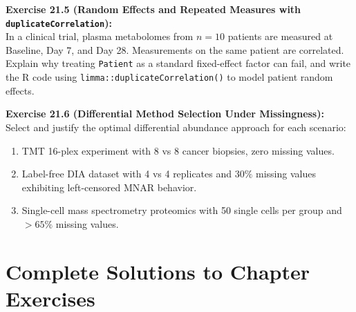 \documentclass[11pt,twoside,openright]{book}
\begin{document}
\vspace{0.5em}
\noindent
\textbf{Exercise 21.5 (Random Effects and Repeated Measures with \texttt{duplicateCorrelation}):}\\
In a clinical trial, plasma metabolomes from $n = 10$ patients are measured at Baseline, Day 7, and Day 28. Measurements on the same patient are correlated. Explain why treating \texttt{Patient} as a standard fixed-effect factor can fail, and write the R code using \texttt{limma::duplicateCorrelation()} to model patient random effects.

\vspace{0.5em}
\noindent
\textbf{Exercise 21.6 (Differential Method Selection Under Missingness):}\\
Select and justify the optimal differential abundance approach for each scenario:
\begin{enumerate}
    \item TMT 16-plex experiment with 8 vs 8 cancer biopsies, zero missing values.
    \item Label-free DIA dataset with 4 vs 4 replicates and $30\%$ missing values exhibiting left-censored MNAR behavior.
    \item Single-cell mass spectrometry proteomics with 50 single cells per group and $> 65\%$ missing values.
\end{enumerate}

\section{Complete Solutions to Chapter Exercises}
\end{document}
